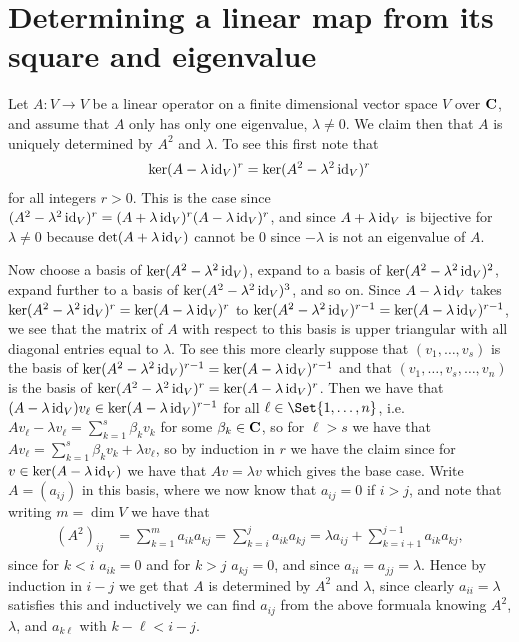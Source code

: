\section{Determining a linear map from its square and eigenvalue}

Let $A\colon V\to V$ be a linear operator on a finite dimensional vector space $V$ over $\mathbf{C}$, and assume that $A$ only has only one eigenvalue, $\lambda\neq 0$. We claim then that $A$ is uniquely determined by $A^2$ and $\lambda$. To see this first note that
\begin{align*}
  \ker(A-\lambda \operatorname{id}_V)^r = \ker(A^2-\lambda^2\operatorname{id}_V)^r
\end{align*}
for all integers $r>0$. This is the case since $(A^2-\lambda^2\operatorname{id}_V)^r = (A+\lambda\operatorname{id}_V)^r(A-\lambda\operatorname{id}_V)^r$, and since $A+\lambda\operatorname{id}_V$ is bijective for $\lambda\neq 0$ because $\det(A+\lambda\operatorname{id}_V)$ cannot be $0$ since $-\lambda$ is not an eigenvalue of $A$.

Now choose a basis of $\ker(A^2-\lambda^2\operatorname{id}_V)$, expand to a basis of $\ker(A^2-\lambda^2\operatorname{id}_V)^2$, expand further to a basis of $\ker(A^2-\lambda^2\operatorname{id}_V)^3$, and so on. Since $A-\lambda\operatorname{id}_V$ takes $\ker(A^2-\lambda^2\operatorname{id}_V)^r=\ker(A-\lambda\operatorname{id}_V)^r$ to $\ker(A^2-\lambda^2\operatorname{id}_V)^{r-1}=\ker(A-\lambda\operatorname{id}_V)^{r-1}$, we see that the matrix of $A$ with respect to this basis is upper triangular with all diagonal entries equal to $\lambda$. To see this more clearly suppose that $(v_1,\dotsc,v_s)$ is the basis of $\ker(A^2-\lambda^2\operatorname{id}_V)^{r-1}=\ker(A-\lambda\operatorname{id}_V)^{r-1}$ and that $(v_1,\dotsc,v_s,\dotsc,v_n)$ is the basis of $\ker(A^2-\lambda^2\operatorname{id}_V)^r = \ker(A-\lambda\operatorname{id}_V)^r$. Then we have that $(A-\lambda\operatorname{id}_V)v_\ell \in \ker(A-\lambda\operatorname{id}_V)^{r-1}$ for all $\ell\in\Set{1,\dotsc,n}$, i.e. $Av_\ell - \lambda v_\ell = \sum_{k=1}^s \beta_k v_k$ for some $\beta_k\in\mathbf{C}$, so for $\ell>s$ we have that $Av_\ell = \sum_{k=1}^s \beta_k v_k + \lambda v_\ell$, so by induction in $r$ we have the claim since for $v\in \ker(A-\lambda\operatorname{id}_V)$ we have that $Av = \lambda v$ which gives the base case. Write $A=(a_{ij})$ in this basis, where we now know that $a_{ij}=0$ if $i>j$, and note that writing $m=\dim V$ we have that
\begin{align*}
  (A^2)_{ij} &= \sum_{k=1}^m a_{ik}a_{kj} = \sum_{k=i}^j a_{ik}a_{kj} = \lambda a_{ij} + \sum_{k=i+1}^{j-1} a_{ik}a_{kj},
\end{align*}
since for $k<i$ $a_{ik}=0$ and for $k>j$ $a_{kj}=0$, and since $a_{ii}=a_{jj}=\lambda$. Hence by induction in $i-j$ we get that $A$ is determined by $A^2$ and $\lambda$, since clearly $a_{ii}=\lambda$ satisfies this and inductively we can find $a_{ij}$ from the above formuala knowing $A^2$, $\lambda$, and $a_{k\ell}$ with $k-\ell<i-j$.

